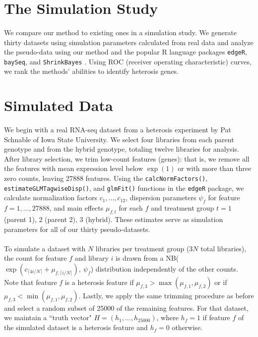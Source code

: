 \documentclass{article}
\begin{document}
\begin{flushleft}


\section{The Simulation Study}

\paragraph{} We compare our method to existing ones in a simulation study. We generate thirty datasets using simulation parameters calculated from real data and analyze the pseudo-data using our method and the popular R language packages {\tt edgeR}, {\tt baySeq}, and {\tt ShrinkBayes} \cite{cran} \cite{bioconductor}. Using ROC (receiver operating characteristic) curves, we rank the methods' abilities to identify heterosis genes.

\section{Simulated Data}

\paragraph{} {\color{red} We begin with a real RNA-seq dataset from a heterosis experiment by Pat Schnable of Iowa State University. We select four libraries from each parent genotype and from the hybrid genotype, totaling twelve libraries for analysis.} After library selection, we trim low-count features (genes): that is, we remove all the features with mean expression level below $\exp(1)$ or with more than three zero counts, leaving 27888 features. Using the {\tt calcNormFactors()}, {\tt estimateGLMTagwiseDisp()}, and {\tt glmFit()} functions in the {\tt edgeR} package, we calculate normalization factors $c_1, \ldots, c_{12}$, dispersion parameters $\psi_{f}$ for feature $f = 1, \ldots, 27888$, and main effects $\mu_{f, t}$ for each $f$ and treatment group $t = 1$ (parent 1), 2 (parent 2), 3 (hybrid). These estimates serve as simulation parameters for all of our thirty pseudo-datasets.

\paragraph{} To simulate a dataset with $N$ libraries per treatment group ($3N$ total libraries), the count for feature $f$ and library $i$ is drawn from a NB($\exp(c_{\lceil 4i/N \rceil} + \mu_{f, \lceil i/N \rceil}), \ \psi_f$) distribution independently of the other counts. Note that feature $f$ is a heterosis feature if $\mu_{f, 3} > \max(\mu_{f, 1}, \mu_{f, 2})$ or if $\mu_{f, 3} < \min(\mu_{f, 1}, \mu_{f, 2})$. Lastly, we apply the same trimming procedure as before and select a random subset of 25000 of the remaining features. For that dataset, we maintain a ``truth vector" $H = (h_1, \ldots, h_{25000})$, where $h_f = 1$ if feature $f$ of the simulated dataset is a heterosis feature and $h_f = 0$ otherwise.


\end{flushleft}
\end{document}
